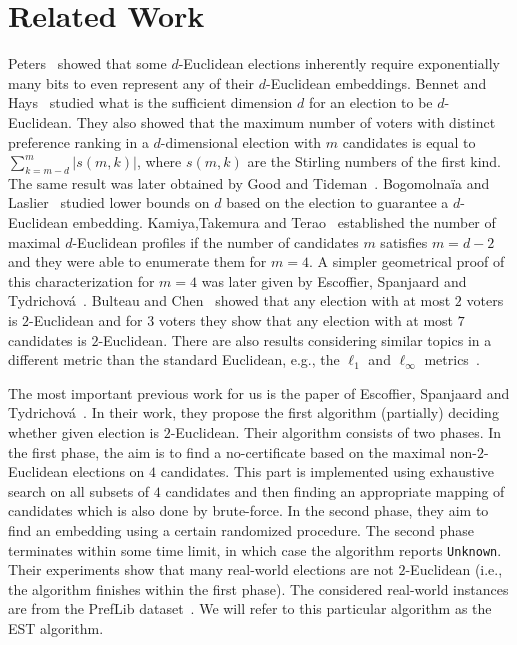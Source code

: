 \section{Related Work}
Peters~\cite{Peters17} showed that some $d$-Euclidean elections inherently require exponentially many bits to even represent any of their $d$-Euclidean embeddings. Bennet and Hays~\cite{HaysW1961,Bennett1960} studied what is the sufficient dimension $d$ for an election to be $d$-Euclidean. They also showed that the maximum number of voters with distinct preference ranking in a $d$-dimensional election with $m$ candidates is equal to $\sum_{k=m-d}^m |s(m,k)|$, where $s(m,k)$ are the Stirling numbers of the first kind. The same result was later obtained by Good and Tideman~\cite{Good1977}. Bogomolnaïa and Laslier~\cite{BogomolnaiaL07} studied lower bounds on $d$ based on the election to guarantee a $d$-Euclidean embedding. Kamiya,Takemura and Terao~\cite{KamiyaTT11} established the number of maximal $d$-Euclidean profiles if the number of candidates $m$ satisfies $m=d-2$ and they were able to enumerate them for $m=4$. A simpler geometrical proof of this characterization for $m=4$ was later given by Escoffier, Spanjaard and Tydrichová~\cite{EscoffierST22_arx}. Bulteau and Chen~\cite{BulteauC23} showed that any election with at most $2$ voters is $2$-Euclidean and for $3$ voters they show that any election with at most $7$ candidates is $2$-Euclidean.  There are also results considering similar topics  in a different metric than the standard Euclidean, e.g., the $\ell_1$ and $\ell_\infty$ metrics~\cite{EscoffierST22_arx,Chen22_arx}. 

The most important previous work for us is the paper of Escoffier, Spanjaard and Tydrichová~\cite{EscoffierST23}. In their work, they propose the first algorithm (partially) deciding whether given election is $2$-Euclidean. Their algorithm consists of two phases. In the first phase, the aim is to find a no-certificate based on the maximal non-$2$-Euclidean elections on $4$ candidates. This part is implemented using exhaustive search on all subsets of $4$ candidates and then finding an appropriate mapping of candidates which is also done by brute-force. In the second phase, they aim to find an embedding using a certain randomized procedure. The second phase terminates within some time limit, in which case the algorithm reports \texttt{Unknown}. Their experiments show that many real-world elections are not $2$-Euclidean (i.e., the algorithm finishes within the first phase). The considered real-world instances are from the PrefLib dataset~\cite{Preflib}. We will refer to this particular algorithm as the EST algorithm.
